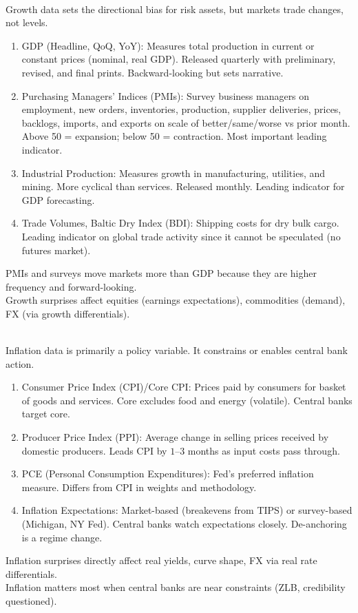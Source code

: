 \begin{remark} \\
Growth data sets the directional bias for risk assets, but markets trade changes, not levels.
\begin{enumerate}[label=\roman*.]
\setlength{\itemsep}{0pt}
\item GDP (Headline, QoQ, YoY): Measures total production in current or constant prices (nominal, real GDP). Released quarterly with preliminary, revised, and final prints. Backward-looking but sets narrative.
\item Purchasing Managers' Indices (PMIs): Survey business managers on employment, new orders, inventories, production, supplier deliveries, prices, backlogs, imports, and exports on scale of better/same/worse vs prior month. Above 50 = expansion; below 50 = contraction. Most important leading indicator.
\item Industrial Production: Measures growth in manufacturing, utilities, and mining. More cyclical than services. Released monthly. Leading indicator for GDP forecasting.
\item Trade Volumes, Baltic Dry Index (BDI): Shipping costs for dry bulk cargo. Leading indicator on global trade activity since it cannot be speculated (no futures market).
\end{enumerate}
PMIs and surveys move markets more than GDP because they are higher frequency and forward-looking.\\
Growth surprises affect equities (earnings expectations), commodities (demand), FX (via growth differentials).
\end{remark}

\begin{remark} \\
Inflation data is primarily a policy variable. It constrains or enables central bank action.
\begin{enumerate}[label=\roman*.]
\setlength{\itemsep}{0pt}
\item Consumer Price Index (CPI)/Core CPI: Prices paid by consumers for basket of goods and services. Core excludes food and energy (volatile). Central banks target core.
\item Producer Price Index (PPI): Average change in selling prices received by domestic producers. Leads CPI by $1$--$3$ months as input costs pass through.
\item PCE (Personal Consumption Expenditures): Fed's preferred inflation measure. Differs from CPI in weights and methodology.
\item Inflation Expectations: Market-based (breakevens from TIPS) or survey-based (Michigan, NY Fed). Central banks watch expectations closely. De-anchoring is a regime change.
\end{enumerate}
Inflation surprises directly affect real yields, curve shape, FX via real rate differentials.\\
Inflation matters most when central banks are near constraints (ZLB, credibility questioned).
\end{remark}

